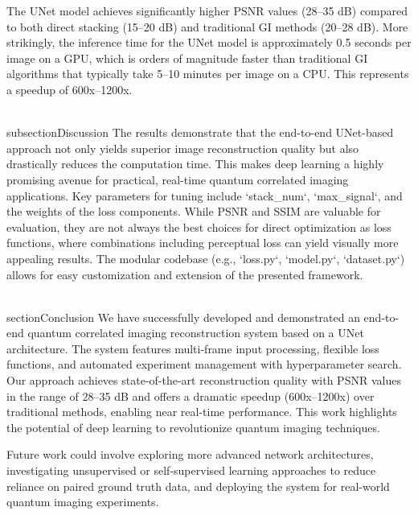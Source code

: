 \documentclass[10pt,journal]{IEEEtran} %
\begin{document}
The UNet model achieves significantly higher PSNR values (28--35 dB) compared to both direct stacking (15--20 dB) and traditional GI methods (20--28 dB). More strikingly, the inference time for the UNet model is approximately 0.5 seconds per image on a GPU, which is orders of magnitude faster than traditional GI algorithms that typically take 5--10 minutes per image on a CPU. This represents a speedup of 600x--1200x.

\\subsection{Discussion}
The results demonstrate that the end-to-end UNet-based approach not only yields superior image reconstruction quality but also drastically reduces the computation time. This makes deep learning a highly promising avenue for practical, real-time quantum correlated imaging applications.
Key parameters for tuning include `stack_num`, `max_signal`, and the weights of the loss components. While PSNR and SSIM are valuable for evaluation, they are not always the best choices for direct optimization as loss functions, where combinations including perceptual loss can yield visually more appealing results. The modular codebase (e.g., `loss.py`, `model.py`, `dataset.py`) allows for easy customization and extension of the presented framework.

\\section{Conclusion}
We have successfully developed and demonstrated an end-to-end quantum correlated imaging reconstruction system based on a UNet architecture. The system features multi-frame input processing, flexible loss functions, and automated experiment management with hyperparameter search. Our approach achieves state-of-the-art reconstruction quality with PSNR values in the range of 28--35 dB and offers a dramatic speedup (600x--1200x) over traditional methods, enabling near real-time performance. This work highlights the potential of deep learning to revolutionize quantum imaging techniques.

Future work could involve exploring more advanced network architectures, investigating unsupervised or self-supervised learning approaches to reduce reliance on paired ground truth data, and deploying the system for real-world quantum imaging experiments.


\
\ %
\end{document}

